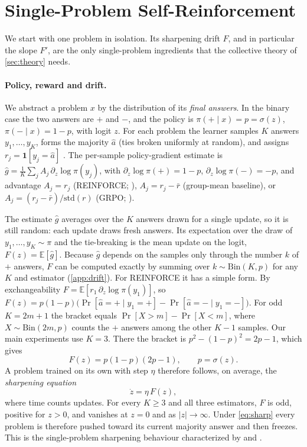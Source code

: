 \section{Single-Problem Self-Reinforcement}
\label{sec:single}

We start with one problem in isolation. Its sharpening drift $F$, and in particular the slope $F'$, are the only single-problem ingredients that the collective theory of \cref{sec:theory} needs.

\paragraph{Policy, reward and drift.}
We abstract a problem $x$ by the distribution of its \emph{final answers}.
In the binary case the two answers are $+$ and $-$, and the policy is $\pi(+\mid x)=p=\sigma(z)$, $\pi(-\mid x)=1-p$, with logit $z$.
For each problem the learner samples $K$ answers $y_1,\dots,y_K$, forms the majority $\hat a$ (ties broken uniformly at random), and assigns $r_j=\mathbf 1[y_j=\hat a]$ \citep{ttrl}.
The per-sample policy-gradient estimate is $\hat g=\frac1K\sum_j A_j\,\partial_z\log\pi(y_j)$, with $\partial_z\log\pi(+)=1-p$, $\partial_z\log\pi(-)=-p$, and advantage $A_j=r_j$ (REINFORCE; \citealp{williams1992}), $A_j=r_j-\bar r$ (group-mean baseline), or $A_j=(r_j-\bar r)/\mathrm{std}(r)$ (GRPO; \citealp{deepseekmath}).

The estimate $\hat g$ averages over the $K$ answers drawn for a single update, so it is still random: each update draws fresh answers. Its expectation over the draw of $y_1,\dots,y_K\sim\pi$ and the tie-breaking is the mean update on the logit, $F(z)=\mathbb E[\hat g]$.
Because $\hat g$ depends on the samples only through the number $k$ of $+$ answers, $F$ can be computed exactly by summing over $k\sim\mathrm{Bin}(K,p)$ for any $K$ and estimator (\cref{app:drift}).
For REINFORCE it has a simple form. By exchangeability $F=\mathbb E[r_1\,\partial_z\log\pi(y_1)]$, so $F(z)=p(1-p)\big(\Pr[\hat a=+\mid y_1=+]-\Pr[\hat a=-\mid y_1=-]\big)$.
For odd $K=2m+1$ the bracket equals $\Pr[X>m]-\Pr[X<m]$, where $X\sim\mathrm{Bin}(2m,p)$ counts the $+$ answers among the other $K-1$ samples.
Our main experiments use $K=3$. There the bracket is $p^2-(1-p)^2=2p-1$, which gives
\begin{equation}
  F(z)=p(1-p)(2p-1),\qquad p=\sigma(z).
  \label{eq:F}
\end{equation}
A problem trained on its own with step $\eta$ therefore follows, on average, the \emph{sharpening equation}
\begin{equation}
  \dot z=\eta\,F(z),
  \label{eq:sharp}
\end{equation}
where time counts updates.
For every $K\ge3$ and all three estimators, $F$ is odd, positive for $z>0$, and vanishes at $z=0$ and as $|z|\to\infty$. Under \cref{eq:sharp} every problem is therefore pushed toward its current majority answer and then freezes.
This is the single-problem sharpening behaviour characterized by \citet{huang2025sharpening} and \citet{he2026urlvr}.

